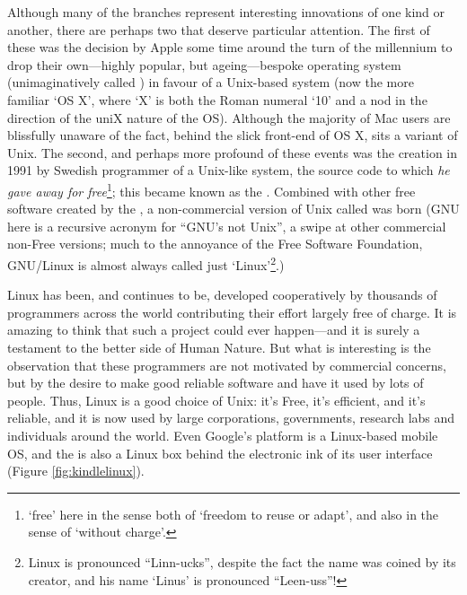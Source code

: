 Although many of the branches represent interesting innovations of one kind or another, there are perhaps two that deserve particular attention. The first of these was the decision by Apple some time around the turn of the millennium to drop their own---highly popular, but ageing---bespoke operating system (unimaginatively called ) in favour of a Unix-based system (now the more familiar `OS X', where `X' is both the Roman numeral `10' and a nod in the direction of the uniX nature of the OS). Although the majority of Mac users are blissfully unaware of the fact, behind the slick front-end of OS X, sits a variant of Unix. The second, and perhaps more profound of these events was the creation in 1991 by Swedish programmer  of a Unix-like system, the source code to which \emph{he gave away for free}\footnote{`free' here in the sense both of `freedom to reuse or adapt', and also in the sense of `without charge'.}; this became known as the . Combined with other free software created by the , a non-commercial version of Unix called  was born (GNU here is a recursive acronym for ``GNU's not Unix'', a swipe at other commercial non-Free versions; much to the annoyance of the Free Software Foundation, GNU/Linux is almost always called just `Linux'\footnote{Linux
is pronounced ``Linn-ucks'', despite the fact the name was coined by
its creator, and his name `Linus' is pronounced
``Leen-uss''!}.) 

Linux has been, and continues to be, developed cooperatively by
thousands of programmers across the world contributing their effort
largely free of charge. It is amazing to think that such
a project could ever happen---and it is surely a testament to the
better side of Human Nature. But what is interesting is the
observation that these programmers are not motivated by commercial
concerns, but by the desire to make good reliable software and have it
used by lots of people. Thus, Linux is a good choice of Unix: it's
Free, it's efficient, and it's reliable, and it is now used by large corporations, governments, research labs and individuals around the world. Even Google's  platform is a Linux-based mobile OS, and the   is also a Linux box behind the electronic ink of its user interface (Figure \ref{fig:kindlelinux}).

